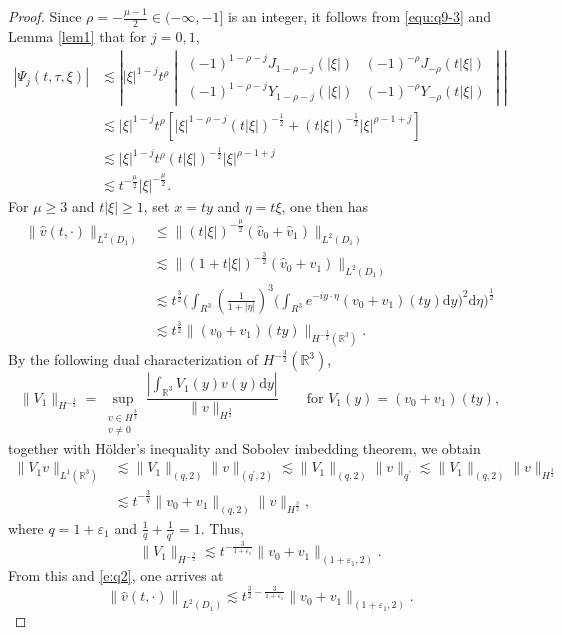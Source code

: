\documentclass[11pt,twoside]{article}
\newcommand{\R}{\mathbb R}
\newcommand{\f}{\frac}
\theoremstyle{plain}
\theoremstyle{definition}
\theoremstyle{remark}
\numberwithin{equation}{section}
\begin{document}
\begin{proof}
Since $\rho=-\f{\mu-1}{2}\in(-\infty, -1]$ is an integer, it follows from \eqref{equ:q9-3} and Lemma \ref{lem1} that for $j=0,1$,
\begin{equation}\label{e:q1}
\begin{aligned}
|\Psi_j(t,\tau,\xi)|
&\lesssim\left| |\xi|^{1-j} t^{\rho}
\begin{vmatrix}
(-1)^{1-\rho-j}J_{1-\rho-j}(|\xi|) & (-1)^{-\rho}J_{-\rho}(t|\xi|) \\
(-1)^{1-\rho-j}Y_{1-\rho-j}(|\xi|) & (-1)^{-\rho}Y_{-\rho}(t|\xi|)
\end{vmatrix} \right|\\
&\lesssim |\xi|^{1-j} t^{\rho}\left[|\xi|^{1-\rho-j}(t|\xi|)^{-\f12}+(t|\xi|)^{-\f12}|\xi|^{\rho-1+j}\right]\\
&\lesssim |\xi|^{1-j} t^{\rho}(t|\xi|)^{-\f12}|\xi|^{\rho-1+j}\\
&\lesssim t^{-\f{\mu}{2}}|\xi|^{-\f{\mu}{2}}.
\end{aligned}
\end{equation}
For $\mu\geq3$ and $t|\xi|\geq 1$, set
$x=ty$ and $\eta=t\xi$, one then has
\begin{equation}\label{e:q2}
\begin{aligned}
\big\|\hat{v}(t, \cdot)\big\|_{L^2(D_1)} & \leq\big\|(t|\xi|)^{-\f{\mu}{2}}(\hat{v}_{0}+\hat{v}_{1})\big\|_{L^{2}(D_1)} \\& \lesssim\big\|(1+t|\xi|)^{-\f32}(\hat{v}_{0}+\hat{v}_{1})\big\|_{L^{2}(D_1)} \\
& \lesssim t^{\f32}\big(\int_{R^3} (\frac{1}{1+|\eta|})^3\big(\int_{R^3} e^{-i y \cdot \eta} (v_0+v_1)(ty) \mathrm{d} y\big)^2 \mathrm{d} \eta\big)^{\frac{1}{2}}\\
& \lesssim t^{\f32}\|(v_0+v_1)(ty)\|_{H^{-\f32}(\R^3)}.
\end{aligned}
\end{equation}
By the following dual characterization of $H^{-\f32}(\R^3)$, $$\|V_1\|_{H^{-\f32}}=\sup _{\substack{v \in H^\f32 \\ v \neq 0}} \frac{\left|\int_{\mathbb{R}^3} V_1(y) v(y) \mathrm{d} y\right|}{\|v\|_{H^{\f32}}}\qquad \text{for}\,\, V_1(y)=(v_0+v_1)(ty),$$
together with H\"{o}lder's inequality and Sobolev imbedding theorem, we obtain
\begin{equation}\label{e:q3}
\begin{aligned}
\|V_1 v\|_{L^1(\R^3)} &\lesssim\|V_1\|_{(q, 2)}\|v\|_{\left(q^{\prime}, 2\right)} \lesssim\|V_1\|_{(q, 2)}\|v\|_{q^{\prime}} \lesssim\|V_1\|_{(q, 2)}\|v\|_{H^{\f32}}\\
&\lesssim t^{-\f{3}{q}}\|v_0+v_1\|_{(q, 2)}\|v\|_{H^{\f32}},
\end{aligned}
\end{equation}
where $q=1+\varepsilon_1$  and $\f{1}{q}+\f{1}{q'}=1$. Thus,
$$
\|V_1\|_{H^{-\f32}}\lesssim t^{-\f{3}{1+\varepsilon_1}}\|v_0+v_1\|_{(1+\varepsilon_1, 2)}.
$$
From this and \eqref{e:q2}, one arrives at
\begin{equation}\label{e:q4}
\left\|\hat{v}(t, \cdot)\right\|_{L^2(D_1)}\lesssim t^{\f32-\f{3}{1+\varepsilon_1}}\|v_0+v_1\|_{(1+\varepsilon_1, 2)}.
\end{equation}


\end{proof}
\end{document}
